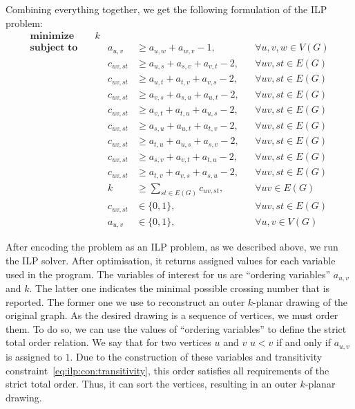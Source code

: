 Combining everything together, we get the following formulation of the ILP problem:
\begin{align}
    \textbf{minimize}\quad&k  \label{eq:ilp:objective}\\
    \textbf{subject to}\quad
    &&a_{u, v} &\geqslant a_{u, w} + a_{w, v} - 1,&&\forall u, v, w \in V(G)  \label{eq:ilp:con:transitivity}\\
    &&c_{uv, st} &\geqslant a_{u,s} + a_{s,v} + a_{v,t} - 2,&&\forall uv, st \in E(G)  \label{eq:ilp:con:cross-example}\\
    &&c_{uv, st} &\geqslant a_{u,t} + a_{t,v} + a_{v,s} - 2,&&\forall uv, st \in E(G) \label{eq:ilp:con:cross-begin}\\
    &&c_{uv, st} &\geqslant a_{v,s} + a_{s,u} + a_{u,t} - 2,&&\forall uv, st \in E(G)\\
    &&c_{uv, st} &\geqslant a_{v,t} + a_{t,u} + a_{u,s} - 2,&&\forall uv, st \in E(G)\\
    &&c_{uv, st} &\geqslant a_{s,u} + a_{u,t} + a_{t,v} - 2,&&\forall uv, st \in E(G)\\
    &&c_{uv, st} &\geqslant a_{t,u} + a_{u,s} + a_{s,v} - 2,&&\forall uv, st \in E(G)\\
    &&c_{uv, st} &\geqslant a_{s,v} + a_{v,t} + a_{t,u} - 2,&&\forall uv, st \in E(G)\\
    &&c_{uv, st} &\geqslant a_{t,v} + a_{v,s} + a_{s,u} - 2,&&\forall uv, st \in E(G)  \label{eq:ilp:con:cross-end}\\
    &&k &\geqslant \sum_{st \in E(G)} c_{uv, st},&&\forall uv \in E(G)  \label{eq:ilp:con:crossing-number}\\
    &&c_{uv, st} &\in \{0, 1\},&&\forall uv, st \in E(G)  \label{eq:ilp:con:cross-var}\\
    &&a_{u, v} &\in \{0, 1\},&&\forall u, v \in V(G)  \label{eq:ilp:con:order-var}
\end{align}

After encoding the problem as an ILP problem, as we described above, we run the ILP solver. After optimisation, it returns assigned values for each variable used in the program. The variables of interest for us are ``ordering variables'' \(a_{u, v}\) and \(k\). The latter one indicates the minimal possible crossing number that is reported. The former one we use to reconstruct an outer \(k\)-planar drawing of the original graph. As the desired drawing is a sequence of vertices, we must order them. To do so, we can use the values of ``ordering variables'' to define the strict total order relation. We say that for two vertices \(u\) and \(v\) \(u < v\) if and only if \(a_{u, v}\) is assigned to \(1\). Due to the construction of these variables and transitivity constraint~\eqref{eq:ilp:con:transitivity}, this order satisfies all requirements of the strict total order. Thus, it can sort the vertices, resulting in an outer \(k\)-planar drawing.


